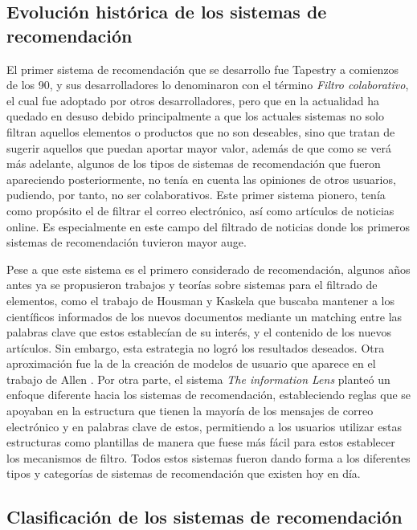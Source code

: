 \subsection{Evolución histórica de los sistemas de recomendación}

El primer sistema de recomendación que se desarrollo fue Tapestry \cite{Goldberg:1992:UCF:138859.138867} a comienzos de los 90, y sus desarrolladores lo denominaron con el término \textit{Filtro colaborativo}, el cual fue adoptado por otros desarrolladores, pero que en la actualidad ha quedado en desuso debido principalmente a que los actuales sistemas no solo filtran aquellos elementos o productos que no son deseables, sino que tratan de sugerir aquellos que puedan aportar mayor valor, además de que como se verá más adelante, algunos de los tipos de sistemas de recomendación que fueron apareciendo posteriormente, no tenía en cuenta las opiniones de otros usuarios, pudiendo, por tanto, no ser colaborativos. Este primer sistema pionero, tenía como propósito el de filtrar el correo electrónico,  así como artículos de noticias online. Es especialmente en este campo del filtrado de noticias donde los primeros sistemas de recomendación tuvieron mayor auge. 

 Pese a que este sistema es el primero considerado de recomendación, algunos años antes ya se propusieron trabajos y teorías sobre sistemas para el filtrado de elementos, como el trabajo de Housman y Kaskela \cite{4322444} que buscaba mantener a los científicos informados de los nuevos documentos mediante un matching entre las palabras clave que estos establecían de su interés, y el contenido de los nuevos artículos. Sin embargo, esta estrategia no logró los resultados deseados. Otra aproximación fue la de la creación de modelos de usuario que aparece en el trabajo de Allen \cite{allen1990user}. Por otra parte, el sistema \textit{The information Lens} \cite{Malone:1986:ILI:22339.22340} planteó un enfoque diferente hacia los sistemas de recomendación, estableciendo reglas que se apoyaban en la estructura que tienen la mayoría de los mensajes de correo electrónico y en palabras clave de estos, permitiendo a los usuarios utilizar estas estructuras como plantillas de manera que fuese más fácil para estos establecer los mecanismos de filtro. Todos estos sistemas fueron dando forma a los diferentes tipos y categorías de sistemas de recomendación que existen hoy en día.

\subsection{Clasificación de los sistemas de recomendación}

